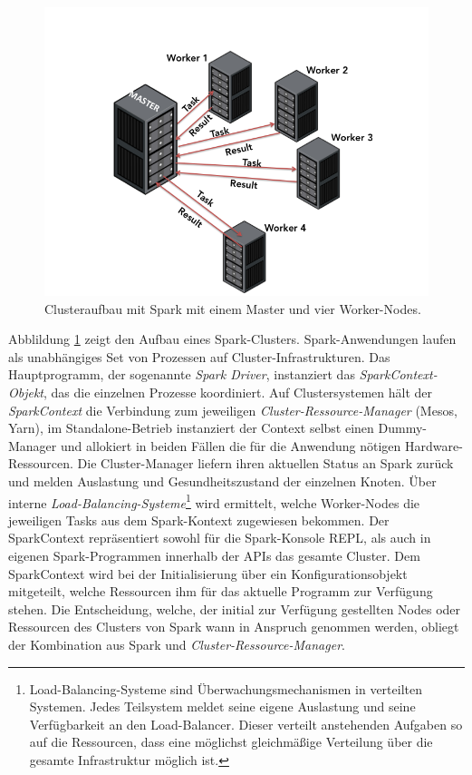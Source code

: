 \begin{figure}[htb!]
\centering
\includegraphics[width=1.0\textwidth]{bilder/spark1.png}
\caption{Clusteraufbau mit Spark mit einem Master und vier Worker-Nodes. }
\label{fig:sparkclustermastermitworker}
\end{figure} 



Abblildung \ref{fig:sparkclustermastermitworker} zeigt den Aufbau eines Spark-Clusters. Spark-Anwendungen laufen als unabhängiges Set von Prozessen auf Cluster-Infrastrukturen. Das Hauptprogramm, der sogenannte \textit{Spark Driver}, instanziert das\textit{ SparkContext-Objekt}, das die einzelnen Prozesse koordiniert. Auf Clustersystemen hält der \textit{SparkContext} die Verbindung zum jeweiligen \textit{Cluster-Ressource-Manager} (Mesos, Yarn), im Standalone-Betrieb instanziert der Context selbst einen Dummy-Manager und allokiert in beiden Fällen die für die Anwendung nötigen Hardware-Ressourcen. Die Cluster-Manager liefern ihren aktuellen Status an Spark zurück und melden Auslastung und Gesundheitszustand der einzelnen Knoten. Über interne \textit{Load-Balancing-Systeme}\footnote{Load-Balancing-Systeme sind Überwachungsmechanismen in verteilten Systemen. Jedes Teilsystem meldet seine eigene Auslastung und seine Verfügbarkeit an den Load-Balancer. Dieser verteilt anstehenden Aufgaben so auf die Ressourcen, dass eine möglichst gleichmäßige Verteilung über die gesamte Infrastruktur möglich ist.} wird ermittelt, welche Worker-Nodes die jeweiligen Tasks aus dem Spark-Kontext zugewiesen bekommen. Der SparkContext repräsentiert sowohl für die Spark-Konsole REPL, als auch in eigenen Spark-Programmen innerhalb der APIs das gesamte Cluster. Dem SparkContext wird bei der Initialisierung über ein Konfigurationsobjekt mitgeteilt, welche Ressourcen ihm für das aktuelle Programm zur Verfügung stehen. Die Entscheidung, welche, der initial zur Verfügung gestellten Nodes oder Ressourcen des Clusters von Spark wann in Anspruch genommen werden, obliegt der Kombination aus Spark und \textit{Cluster-Ressource-Manager}. 

